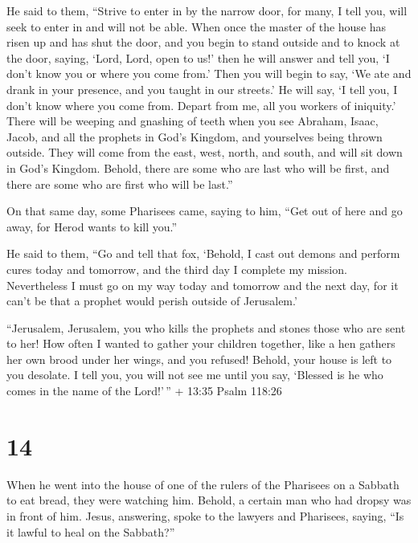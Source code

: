 He said to them,  ``Strive to enter in by the narrow door,
for many, I tell you, will seek to enter in and will not be able.
 When once the master of the house has risen up and has
shut the door, and you begin to stand outside and to knock at the door,
saying, `Lord, Lord, open to us!' then he will answer and tell you, `I
don't know you or where you come from.'  Then you will
begin to say, `We ate and drank in your presence, and you taught in our
streets.'  He will say, `I tell you, I don't know where you
come from. Depart from me, all you workers of iniquity.' 
There will be weeping and gnashing of teeth when you see Abraham, Isaac,
Jacob, and all the prophets in God's Kingdom, and yourselves being
thrown outside.  They will come from the east, west, north,
and south, and will sit down in God's Kingdom.  Behold,
there are some who are last who will be first, and there are some who
are first who will be last.''

 On that same day, some Pharisees came, saying to him,
``Get out of here and go away, for Herod wants to kill you.''

 He said to them, ``Go and tell that fox, `Behold, I cast
out demons and perform cures today and tomorrow, and the third day I
complete my mission.  Nevertheless I must go on my way
today and tomorrow and the next day, for it can't be that a prophet
would perish outside of Jerusalem.'

 ``Jerusalem, Jerusalem, you who kills the prophets and
stones those who are sent to her! How often I wanted to gather your
children together, like a hen gathers her own brood under her wings, and
you refused!  Behold, your house is left to you desolate. I
tell you, you will not see me until you say, `Blessed is he who comes in
the name of the Lord!'\,'' + 13:35 Psalm 118:26

\hypertarget{section-13}{%
\section{14}\label{section-13}}

 When he went into the house of one of the rulers of the
Pharisees on a Sabbath to eat bread, they were watching him.
 Behold, a certain man who had dropsy was in front of him.
 Jesus, answering, spoke to the lawyers and Pharisees,
saying, ``Is it lawful to heal on the Sabbath?''

